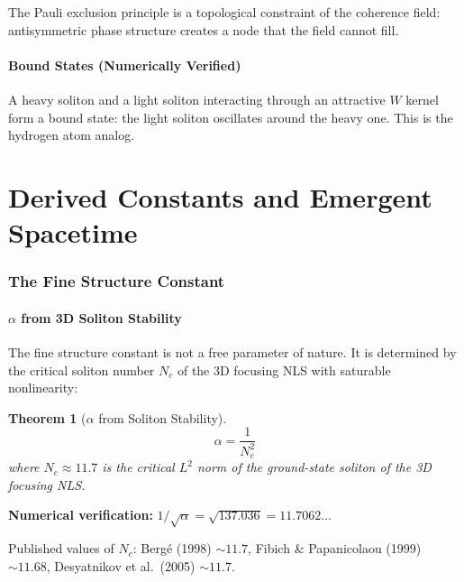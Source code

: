 \documentclass[11pt, a4paper]{article}
\newtheorem{theorem}{Theorem}[section]
\begin{document}
The Pauli exclusion principle is a topological constraint of the
coherence field: antisymmetric phase structure creates a node that
the field cannot fill.

\subsection{Bound States (Numerically Verified)}

A heavy soliton and a light soliton interacting through an attractive
$W$ kernel form a bound state: the light soliton oscillates around
the heavy one. This is the hydrogen atom analog.

\newpage

\part{Derived Constants and Emergent Spacetime}

\section{The Fine Structure Constant}

\subsection{$\alpha$ from 3D Soliton Stability}

The fine structure constant is not a free parameter of nature. It is
determined by the critical soliton number $N_c$ of the 3D focusing
NLS with saturable nonlinearity:

\begin{theorem}[$\alpha$ from Soliton Stability]
\begin{equation}
  \boxed{\alpha = \frac{1}{N_c^2}}
\end{equation}
where $N_c \approx 11.7$ is the critical $L^2$ norm of the
ground-state soliton of the 3D focusing NLS.
\end{theorem}

\textbf{Numerical verification:}
$1/\sqrt{\alpha} = \sqrt{137.036} = 11.7062\ldots$

Published values of $N_c$: Berg\'e (1998) $\sim 11.7$,
Fibich \& Papanicolaou (1999) $\sim 11.68$,
Desyatnikov et al.\ (2005) $\sim 11.7$.
\end{document}
